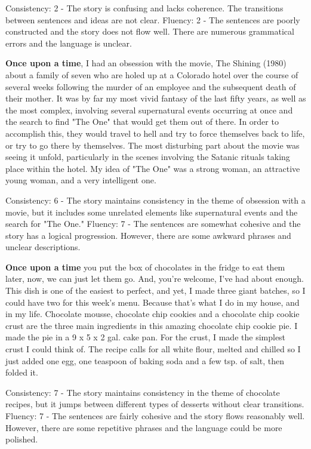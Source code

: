 \documentclass{article}
\begin{document}
Consistency: 2 - The story is confusing and lacks coherence. The transitions between sentences and ideas are not clear.
Fluency: 2 - The sentences are poorly constructed and the story does not flow well. There are numerous grammatical errors and the language is unclear.

\textbf{Once upon a time}, I had an obsession with the movie, The Shining (1980) about a family of seven who are holed up at a Colorado hotel over the course of several weeks following the murder of an employee and the subsequent death of their mother. It was by far my most vivid fantasy of the last fifty years, as well as the most complex, involving several supernatural events occurring at once and the search to find "The One" that would get them out of there. In order to accomplish this, they would travel to hell and try to force themselves back to life, or try to go there by themselves. The most disturbing part about the movie was seeing it unfold, particularly in the scenes involving the Satanic rituals taking place within the hotel. My idea of "The One" was a strong woman, an attractive young woman, and a very intelligent one.

Consistency: 6 - The story maintains consistency in the theme of obsession with a movie, but it includes some unrelated elements like supernatural events and the search for "The One."
Fluency: 7 - The sentences are somewhat cohesive and the story has a logical progression. However, there are some awkward phrases and unclear descriptions.

\textbf{Once upon a time} you put the box of chocolates in the fridge to eat them later, now, we can just let them go. And, you're welcome, I've had about enough.  This dish is one of the easiest to perfect, and yet, I made three giant batches, so I could have two for this week's menu.  Because that's what I do in my house, and in my life.  Chocolate mousse, chocolate chip cookies and a chocolate chip cookie crust are the three main ingredients in this amazing chocolate chip cookie pie. I made the pie in a 9 x 5 x 2 gal. cake pan. For the crust, I made the simplest crust I could think of. The recipe calls for all white flour, melted and chilled so I just added one egg, one teaspoon of baking soda and a few tsp. of salt, then folded it.

Consistency: 7 - The story maintains consistency in the theme of chocolate recipes, but it jumps between different types of desserts without clear transitions.
Fluency: 7 - The sentences are fairly cohesive and the story flows reasonably well. However, there are some repetitive phrases and the language could be more polished.
\end{document}

